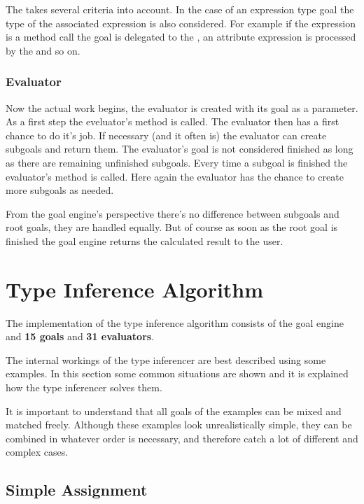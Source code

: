 \documentclass[12pt,halfparskip,DIV11,BCOR10mm]{scrreprt}
\begin{document}
The  takes several criteria into account. In the case of an expression type goal the type of the associated expression is also considered. For example if the expression is a method call the goal is delegated to the , an attribute expression is processed by the  and so on.

\subsubsection{Evaluator}

Now the actual work begins, the evaluator is created with its goal as a parameter. As a first step the eveluator's  method is called. The evaluator then has a first chance to do it's job. If necessary (and it often is) the evaluator can create subgoals and return them. The evaluator's goal is not considered finished as long as there are remaining unfinished subgoals. Every time a subgoal is finished the evaluator's  method is called. Here again the evaluator has the chance to create more subgoals as needed.

From the goal engine's perspective there's no difference between subgoals and root goals, they are handled equally. But of course as soon as the root goal is finished the goal engine returns the calculated result to the user.
    
\section{Type Inference Algorithm}

The implementation of the type inference algorithm consists of the goal engine and \textbf{15 goals} and \textbf{31 evaluators}.

The internal workings of the type inferencer are best described using some examples. In this section some common situations are shown and it is explained how the type inferencer solves them.

It is important to understand that all goals of the examples can be mixed and matched freely. Although these examples look unrealistically simple, they can be combined in whatever order is necessary, and therefore catch a lot of different and complex cases.


\subsection{Simple Assignment}
\end{document}

